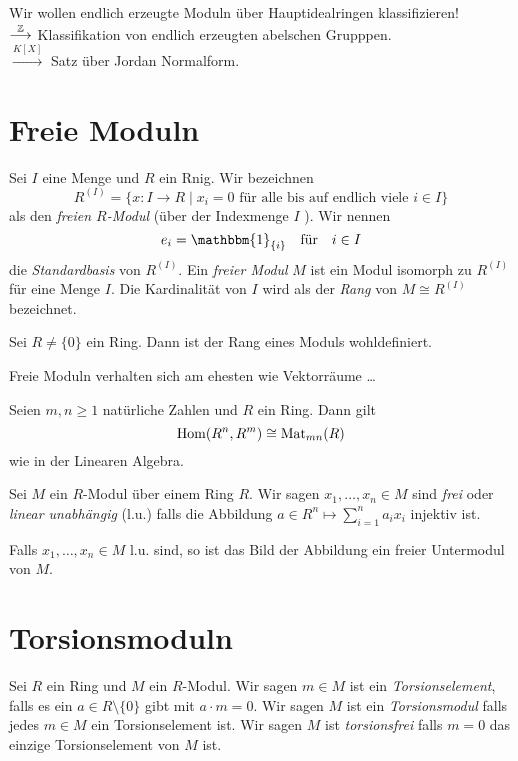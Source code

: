 Wir wollen endlich erzeugte Moduln über Hauptidealringen klassifizieren!\\
$\overset{\mathbb{Z}}{\longrightarrow}$ Klassifikation von endlich erzeugten abelschen Grupppen.\\
$\overset{K[X]}{\longrightarrow}$ Satz über Jordan Normalform.

\section{Freie Moduln}

\begin{definition}
	Sei $I$ eine Menge und $R$ ein Rnig. Wir bezeichnen
	\[
		R^{(I)} = \{x : I \to R \mid x_{i} = 0 \text{ für alle bis auf endlich viele } i \in I\} 
	\] 
	als den \emph{freien $R$-Modul} (über der Indexmenge $I$ ). Wir nennen
	\[
		e_{i} = \mathbbm{1}_{\{i\}} \qq{für} i \in I
	\]
	die \emph{Standardbasis} von $R^{(I)}$.
	Ein \emph{freier Modul} $M$ ist ein Modul isomorph zu $R^{(I)}$ für eine Menge $I$.
	Die Kardinalität von $I$ wird als der \emph{Rang} von $M \cong R^{(I)}$ bezeichnet.
\end{definition}

\begin{lemma}
	Sei $R \neq \{0\} $ ein Ring. Dann ist der Rang eines Moduls wohldefiniert.
\end{lemma}


\begin{claim}
	Freie Moduln verhalten sich am ehesten wie Vektorräume \ldots
\end{claim}

\begin{proposition}
	Seien $m,n \geq 1$ natürliche Zahlen und $R$ ein Ring. Dann gilt
	\[
		\operatorname{Hom}(R^{n},R^{m}) \cong \operatorname{Mat}_{mn}(R)
	\] 
	wie in der Linearen Algebra.
\end{proposition}


\begin{definition}
	Sei $M$ ein $ R$-Modul über einem Ring $R$. Wir sagen $x_1,\ldots,x_{n} \in M$ sind \emph{frei} oder \emph{linear unabhängig} (l.u.) falls die Abbildung
	$a \in R^{n} \mapsto \sum_{i = 1}^{n} a_{i} x_{i}$ injektiv ist.

	Falls $x_1,\ldots,x_{n} \in M$ l.u. sind, so ist das Bild der Abbildung ein freier Untermodul von $M$.
\end{definition}

\section{Torsionsmoduln}
\begin{definition}
	Sei $R$ ein Ring und $M$ ein $R$-Modul. Wir sagen $m \in M$ ist ein \emph{Torsionselement}, falls es ein $a \in R \setminus \{0\} $ gibt
	mit $a \cdot m = 0$. Wir sagen $M$ ist ein \emph{Torsionsmodul} falls jedes $m \in M$ ein Torsionselement ist.
	Wir sagen $M$ ist \emph{torsionsfrei} falls $m = 0$ das einzige Torsionselement von $M$ ist.
\end{definition}


